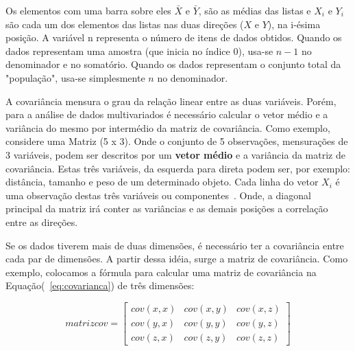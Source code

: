 Os elementos com uma barra sobre eles $\bar{X}$ e $\bar{Y}$, são as médias das listas e $X_{i}$ e $Y_{i}$ são cada um dos elementos das listas nas duas direções ($X$ e $Y$), na i-ésima posição. A variável n representa o número de itens de dados obtidos. Quando os dados representam uma amostra (que inicia no índice $0$), usa-se $n-1$ no denominador e no somatório. Quando os dados representam o conjunto total da "população", usa-se simplesmente $n$ no denominador.
%
%
%

A covariância mensura o grau da relação linear entre as duas variáveis. Porém, para a análise de dados multivariados é necessário calcular o vetor médio e a variância do mesmo por intermédio da matriz de covariância. 
Como exemplo, considere uma Matriz (5 x 3). Onde o conjunto de 5 observações, mensurações de 3 variáveis, podem ser descritos por um \textbf{vetor médio} e a variância da matriz de covariância. Estas três variáveis, da esquerda para direta podem ser, por exemplo: distância, tamanho e peso de um determinado objeto. Cada linha do vetor ${X}_{i}$ é uma observação destas três variáveis ou componentes~\cite{statisticshandbook2009}. Onde, a diagonal principal da matriz irá conter as variâncias e as demais posições a correlação entre as direções.

Se os dados tiverem mais de duas dimensões, é necessário ter a covariância entre cada par de dimensões. A partir dessa idéia, surge a matriz de covariância. Como exemplo, colocamos a fórmula para calcular uma matriz de covariância na Equação(~\ref{eq:covarianca}) de três dimensões:

\[matrizcov = \begin{bmatrix} cov(x,x) & cov(x,y) & cov(x,z) \\ cov(y,x) & cov(y,y) & cov(y,z)\\ cov(z,x) & cov(z,y) & cov(z,z) \end{bmatrix}\]






